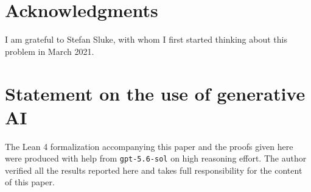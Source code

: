 \documentclass[11pt]{article}
\theoremstyle{definition}
\theoremstyle{remark}
\begin{document}
\section*{Acknowledgments}

I am grateful to Stefan Sluke, with whom I first started thinking about this problem in March 2021.

\section*{Statement on the use of generative AI}

The Lean 4 formalization accompanying this paper and the proofs given here were
produced with help from \texttt{gpt-5.6-sol} on high reasoning effort. The
author verified all the results reported here and takes full responsibility for
the content of this paper.
\end{document}
